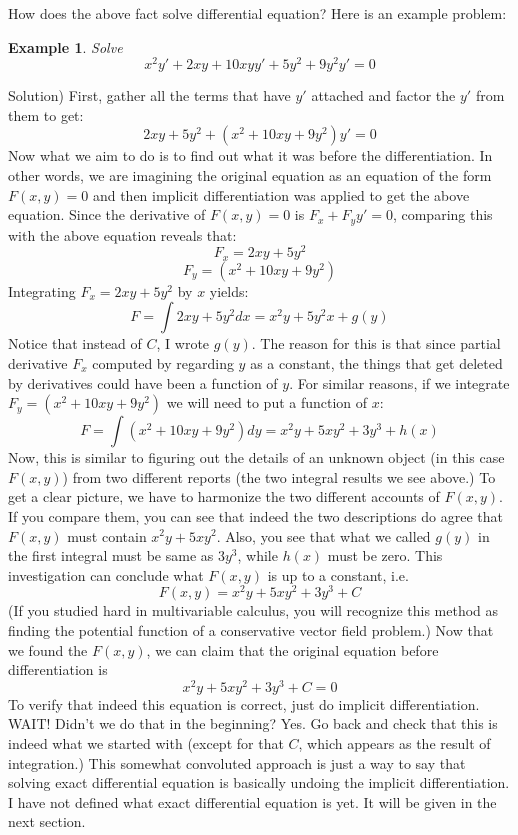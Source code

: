 \documentclass[12pt]{report}
\newtheorem{ex}{Example}[section]
\begin{document}
How does the above fact solve differential equation? Here is an example problem:
\begin{ex} Solve
$$x^2 y' +2xy + 10xy y' + 5y^2 + 9y^2 y' =0 $$
\end{ex}
Solution)
First, gather all the terms that have $y'$ attached and factor the $y'$ from them to get:
$$ 2xy + 5y^2 + (x^2 +10xy + 9y^2) y' =0 $$
Now what we aim to do is to find out what it was before the differentiation. In other words, we are imagining the original equation as an equation of the form $F(x,y)=0$ and then implicit differentiation was applied to get the above equation. Since the derivative of $F(x,y)=0$ is $F_x + F_y y'=0$, comparing this with the above equation reveals that:
$$F_x = 2xy + 5y^2 $$
$$F_y = (x^2 +10xy + 9y^2)$$
Integrating $F_x = 2xy + 5y^2 $ by $x$ yields:
$$F = \int 2xy + 5y^2 dx = x^2 y + 5y^2 x + g(y)$$
Notice that instead of $C$, I wrote $g(y)$. The reason for this is that since partial derivative $F_x$ computed by regarding $y$ as a constant, the things that get deleted by derivatives could have been a function of $y$.
For similar reasons, if we integrate $F_y = (x^2 +10xy + 9y^2)$ we will need to put a function of $x$:
$$F = \int  (x^2 +10xy + 9y^2) dy = x^2 y + 5 x y^2 + 3 y^3 + h(x)$$
Now, this is similar to figuring out the details of an unknown object (in this case $F(x,y)$) from two different reports (the two integral results we see above.) To get a clear picture, we have to harmonize the two different accounts of $F(x,y)$. If you compare them, you can see that indeed the two descriptions do agree that $F(x,y)$ must contain $x^2 y + 5 x y^2$. Also, you see that what we called $g(y)$ in the first integral must be same as $3 y^3$, while $h(x)$ must be zero. This investigation can conclude what $F(x,y)$ is up to a constant, i.e.
$$F(x,y) = x^2 y + 5 x y^2 + 3 y^3 + C$$
(If you studied hard in multivariable calculus, you will recognize this method as finding the potential function of a conservative vector field problem.) Now that we found the $F(x,y)$, we can claim that the original equation before differentiation is
$$x^2 y + 5 x y^2 + 3 y^3 + C = 0$$
To verify that indeed this equation is correct, just do implicit differentiation. WAIT! Didn't we do that in the beginning? Yes. Go back and check that this is indeed what we started with (except for that $C$, which appears as the result of integration.)
This somewhat convoluted approach is just a way to say that solving exact differential equation is basically undoing the implicit differentiation. I have not defined what exact differential equation is yet. It will be given in the next section.
\end{document}

